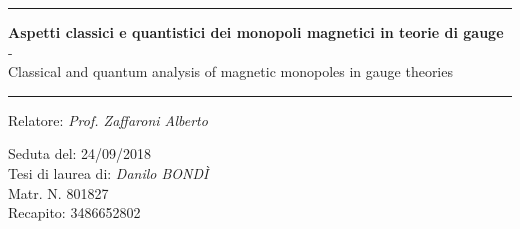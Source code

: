 


\begin{titlepage}


\vspace{2cm}
\hrule
\vspace{0.5cm}

\centering\huge\textbf{
   Aspetti classici e quantistici dei monopoli magnetici in teorie di gauge \\
   }
   -\\
   Classical and quantum analysis of magnetic monopoles in gauge theories

\vspace{0.5cm}
\hrule
\vspace{2cm}

\large
\raggedright Relatore: \emph{Prof. Zaffaroni Alberto} \\
\begin{table}[h]
\large
  Seduta del: 24/09/2018 \\
	Tesi di laurea di: \emph{Danilo BONDÌ} \\
	Matr. N. 801827\\
  Recapito: 3486652802 \\
\end{table}

\vspace{1cm}
\large
\vfill{}

\end{titlepage}


\newpage


\newpage




